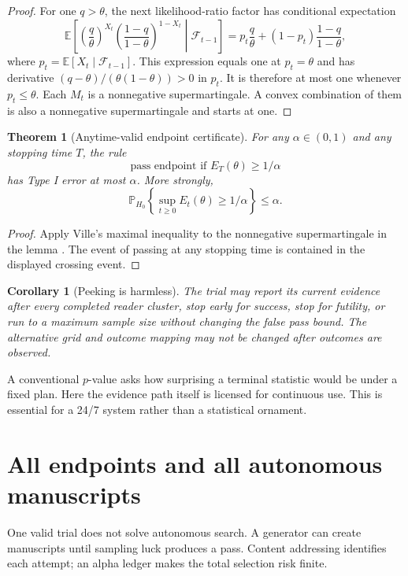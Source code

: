 \documentclass[11pt]{article}
\newtheorem{theorem}{Theorem}
\newtheorem{corollary}{Corollary}
\theoremstyle{remark}
\newcommand{\E}{\mathbb{E}}
\newcommand{\Prb}{\mathbb{P}}
\begin{document}
\begin{proof}
For one $q>\theta$, the next likelihood-ratio factor has conditional expectation
\[
 \E\!\left[
  \left(\frac q\theta\right)^{X_t}
  \left(\frac{1-q}{1-\theta}\right)^{1-X_t}
  \middle|\mathcal F_{t-1}\right]
 =p_t\frac q\theta+(1-p_t)\frac{1-q}{1-\theta},
\]
where $p_t=\E[X_t\mid\mathcal F_{t-1}]$. This expression equals one at $p_t=\theta$ and has
derivative $(q-\theta)/(\theta(1-\theta))>0$ in $p_t$. It is therefore at most one whenever
$p_t\leq\theta$. Each $M_t$ is a nonnegative supermartingale. A convex combination of them
is also a nonnegative supermartingale and starts at one.
\end{proof}

\begin{theorem}[Anytime-valid endpoint certificate]
For any $\alpha\in(0,1)$ and any stopping time $T$, the rule
\[
  \text{pass endpoint if }E_T(\theta)\geq 1/\alpha
\]
has Type I error at most $\alpha$. More strongly,
\[
 \Prb_{H_0}\!\left\{\sup_{t\geq0}E_t(\theta)\geq1/\alpha\right\}\leq\alpha.
\]
\end{theorem}

\begin{proof}
Apply Ville's maximal inequality to the nonnegative supermartingale in the lemma
\cite{ville1939}. The event of passing at any stopping time is contained in the displayed
crossing event.
\end{proof}

\begin{corollary}[Peeking is harmless]
The trial may report its current evidence after every completed reader cluster, stop early
for success, stop for futility, or run to a maximum sample size without changing the false
pass bound. The alternative grid and outcome mapping may not be changed after outcomes are
observed.
\end{corollary}

A conventional $p$-value asks how surprising a terminal statistic would be under a fixed
plan. Here the evidence path itself is licensed for continuous use. This is essential for a
24/7 system rather than a statistical ornament.

\section{All endpoints and all autonomous manuscripts}

One valid trial does not solve autonomous search. A generator can create manuscripts until
sampling luck produces a pass. Content addressing identifies each attempt; an alpha ledger
makes the total selection risk finite.
\end{document}
